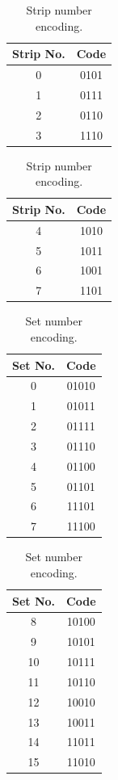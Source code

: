 \documentclass[11pt]{article}
\begin{document}
\begin{table}
\begin{center}
\begin{minipage}{4cm} {
  \begin{tabular}{|c|c|} \hline
    Strip No. & Code \\ \hline
0 & 0101 \\
1 & 0111 \\
2 & 0110 \\
3 & 1110 \\ \hline
  \end{tabular}
}
\end{minipage}
\begin{minipage}{4cm} {
  \begin{tabular}{|c|c|} \hline
    Strip No. & Code \\ \hline
4 & 1010 \\
5 & 1011 \\
6 & 1001 \\
7 & 1101 \\ \hline
  \end{tabular}
}
\end{minipage}
\end{center}
\caption{\label{tab-strip}Strip number encoding.}
\end{table}

\begin{table}
\begin{center}
\begin{minipage}{4cm} {
  \begin{tabular}{|c|c|} \hline
    Set No. & Code \\ \hline
0 & 01010 \\
1 & 01011 \\
2 & 01111 \\
3 & 01110 \\
4 & 01100 \\
5 & 01101 \\
6 & 11101 \\
7 & 11100 \\ \hline
  \end{tabular}
}
\end{minipage}
\begin{minipage}{4cm} {
  \begin{tabular}{|c|c|} \hline
    Set No. & Code \\ \hline
8  & 10100 \\
9  & 10101 \\
10 & 10111 \\
11 & 10110 \\
12 & 10010 \\
13 & 10011 \\
14 & 11011 \\
15 & 11010 \\ \hline
  \end{tabular}
}
\end{minipage}
\end{center}
\caption{\label{tab-set}Set number encoding.}
\end{table}
\end{document}

